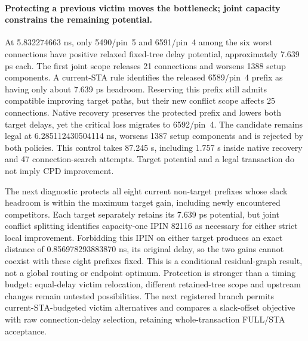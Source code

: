 \paragraph{Protecting a previous victim moves the bottleneck; joint capacity constrains the remaining potential.}
At 5.832274663 ns, only 5490/pin~5 and 6591/pin~4 among the six worst connections have positive relaxed fixed-tree delay potential, approximately 7.639 ps each. The first joint scope releases 21 connections and worsens 1388 setup components. A current-STA rule identifies the released 6589/pin~4 prefix as having only about 7.639 ps headroom. Reserving this prefix still admits compatible improving target paths, but their new conflict scope affects 25 connections. Native recovery preserves the protected prefix and lowers both target delays, yet the critical loss migrates to 6592/pin~4. The candidate remains legal at 6.285112430504114 ns, worsens 1387 setup components and is rejected by both policies. This control takes 87.245 s, including 1.757 s inside native recovery and 47 connection-search attempts. Target potential and a legal transaction do not imply CPD improvement.

The next diagnostic protects all eight current non-target prefixes whose slack headroom is within the maximum target gain, including newly encountered competitors. Each target separately retains its 7.639 ps potential, but joint conflict splitting identifies capacity-one IPIN 82116 as necessary for either strict local improvement. Forbidding this IPIN on either target produces an exact distance of 0.856978293883870 ns, its original delay, so the two gains cannot coexist with these eight prefixes fixed. This is a conditional residual-graph result, not a global routing or endpoint optimum. Protection is stronger than a timing budget: equal-delay victim relocation, different retained-tree scope and upstream changes remain untested possibilities. The next registered branch permits current-STA-budgeted victim alternatives and compares a slack-offset objective with raw connection-delay selection, retaining whole-transaction FULL/STA acceptance.
